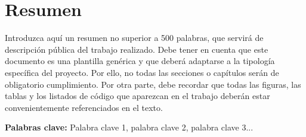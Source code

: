 \newpage{\ }
\thispagestyle{empty}
\chapter*{Resumen}

\noindent Introduzca aquí un resumen no superior a 500 palabras, que servirá de descripción pública del trabajo realizado. Debe tener en cuenta que este documento es una plantilla genérica y que deberá adaptarse a la tipología específica del proyecto. Por ello, no todas las secciones o capítulos serán de obligatorio cumplimiento.
Por otra parte, debe recordar que todas las figuras, las tablas y los listados de código que aparezcan en el trabajo deberán estar convenientemente referenciados en el texto.

\vspace{.5cm}

\noindent \textbf{Palabras clave:} Palabra clave 1, palabra clave 2, palabra clave 3...